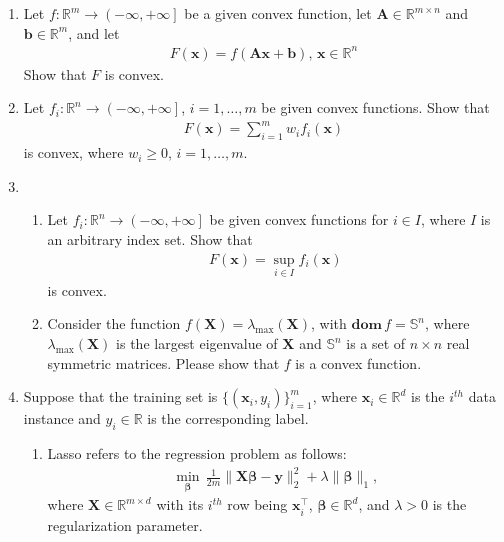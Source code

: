 \documentclass[11pt,letter,notitlepage]{article}
\theoremstyle{definition}
\newcommand{\dom}{ \textbf{dom}  }
\begin{document}
		
		\begin{exercise}
			\begin{enumerate}
				\item Let $f:\mathbb{R}^m \rightarrow \left( -\infty,+\infty \right]$ be a given convex function, let $\mathbf{A}\in \mathbb{R}^{m \times n}$ and $\mathbf{b} \in \mathbb{R}^m$, and let
				\begin{align*}
					F(\mathbf{x}) = f(\mathbf{Ax+b}),\,\mathbf{x}\in\mathbb{R}^n
				\end{align*}
				Show that $F$ is convex.
				\item Let $f_i:\mathbb{R}^n \rightarrow \left(-\infty,+\infty \right]$, $i=1,\dots,m$ be given convex functions. Show that
				\begin{align*}
					F(\mathbf{x}) = \sum_{i=1}^m w_if_i(\mathbf{x})
				\end{align*}
				is convex, where $w_i \geq 0,\,i=1,\dots,m$.
				\item \begin{enumerate}
					\item Let $f_i:\mathbb{R}^n \rightarrow \left(-\infty,+\infty \right]$ be given convex functions for $i \in I$, where $I$ is an arbitrary index set. Show that
					\begin{align*}
						F(\mathbf{x}) = \sup_{i\in I}f_i(\mathbf{x})
					\end{align*}
					is convex.
					\item Consider the function $f(\mathbf{X})=\lambda_{\max}(\mathbf{X})$, with $\dom\, f =\mathbb{S}^n$, where $\lambda_{\max}(\mathbf{X})$ is the largest eigenvalue of $\mathbf{X}$ and $\mathbb{S}^n$ is a set of $n\times n$ real symmetric matrices. Please show that $f$ is a convex function.
				\end{enumerate}
				\item Suppose that the training set is $\{(\mathbf{x}_i,y_i)\}_{i=1}^m$, where $\mathbf{x}_i\in\mathbb{R}^d$ is the $i^{th}$ data instance and $y_i\in\mathbb{R}$ is the corresponding label.
				\begin{enumerate}
					\item Lasso refers to the regression problem as follows:
					\begin{align*}
						\min_{\boldsymbol{\beta}}\,\frac{1}{2m}\|\mathbf{X}\boldsymbol{\beta}-\mathbf{y}\|_2^2+\lambda\|\boldsymbol{\beta}\|_1,
					\end{align*}
					where $\mathbf{X}\in\mathbb{R}^{m\times d}$ with its $i^{th}$ row being $\mathbf{x}_i^{\top}$, $\boldsymbol{\beta} \in \mathbb{R}^d$, and $\lambda>0$ is the regularization parameter.

\end{enumerate}
\end{enumerate}
\end{exercise}
\end{document}
